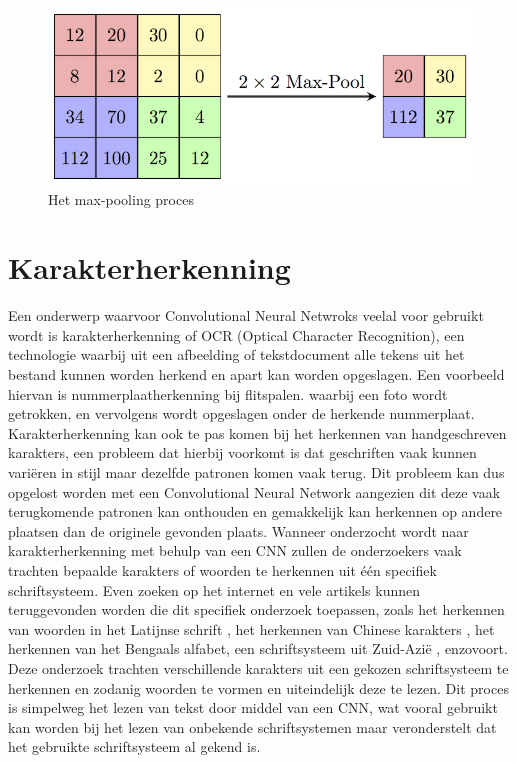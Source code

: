 \begin{figure}
	
	
	\includegraphics[width=\linewidth]{img/pooling.png}
	\caption{Het max-pooling proces}
	
\end{figure}

\section{Karakterherkenning}

Een onderwerp waarvoor Convolutional Neural Netwroks veelal voor gebruikt wordt is karakterherkenning of OCR (Optical Character Recognition), een technologie waarbij uit een afbeelding of tekstdocument alle tekens uit het bestand kunnen worden herkend en apart kan worden opgeslagen.
Een voorbeeld hiervan is nummerplaatherkenning bij flitspalen. waarbij een foto wordt getrokken, en vervolgens wordt opgeslagen onder de herkende nummerplaat.
Karakterherkenning kan ook te pas komen bij het herkennen van handgeschreven karakters, een probleem dat hierbij voorkomt is dat geschriften vaak kunnen variëren in stijl maar dezelfde patronen komen vaak terug.
Dit probleem kan dus opgelost worden met een Convolutional Neural Network aangezien dit deze vaak terugkomende patronen kan onthouden en gemakkelijk kan herkennen op andere plaatsen dan de originele gevonden plaats.
Wanneer onderzocht wordt naar karakterherkenning met behulp van een CNN zullen de onderzoekers vaak trachten bepaalde karakters of woorden te herkennen uit één specifiek schriftsysteem.
Even zoeken op het internet en vele artikels kunnen teruggevonden worden die dit specifiek onderzoek toepassen, zoals het herkennen van woorden in het Latijnse schrift \autocite{Aiquan2012}, het herkennen van Chinese karakters \autocite{Weixin}, het herkennen van het Bengaals alfabet, een schriftsysteem uit Zuid-Azië \autocite{Mahbubar2015}, enzovoort.
Deze onderzoek trachten verschillende karakters uit een gekozen schriftsysteem te herkennen en zodanig woorden te vormen en uiteindelijk deze te lezen. Dit proces is simpelweg het lezen van tekst door middel van een CNN, wat vooral gebruikt kan worden bij het lezen van onbekende schriftsystemen maar veronderstelt dat het gebruikte schriftsysteem al gekend is.

